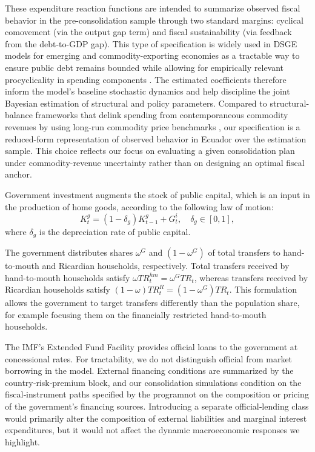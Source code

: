 \documentclass[12pt]{article}
\begin{document}
These expenditure reaction functions are intended to summarize observed fiscal behavior in the pre-consolidation sample through two standard margins: cyclical comovement (via the output gap term) and fiscal sustainability (via feedback from the debt-to-GDP gap). This type of specification is widely used in DSGE models for emerging and commodity-exporting economies as a tractable way to ensure public debt remains bounded while allowing for empirically relevant procyclicality in spending components \citep[see, e.g.,][]{MedinaSoto2016,MelinaYangZanna2016,Buffie2012}. The estimated coefficients therefore inform the model’s baseline stochastic dynamics and help discipline the joint Bayesian estimation of structural and policy parameters. Compared to structural-balance frameworks that delink spending from contemporaneous commodity revenues by using long-run commodity price benchmarks \citep[e.g., Chile’s rule discussed in][]{Frankel2011}, our specification is a reduced-form representation of observed behavior in Ecuador over the estimation sample. This choice reflects our focus on evaluating a given consolidation plan under commodity-revenue uncertainty rather than on designing an optimal fiscal anchor.

Government investment augments the stock of public capital, which is an input in the production of home goods, according to the following law of motion:
\begin{equation*}
K^g_{t} = (1-\delta_g)K^g_{t-1} + G^i_{t}, \quad \delta_g \in [0,1],
\end{equation*}
where $\delta_g$ is the depreciation rate of public capital.

The government distributes shares $\omega^G$ and $(1-\omega^G)$ of total transfers to hand-to-mouth and Ricardian households, respectively. Total transfers received by hand-to-mouth households satisfy $\omega TR_t^{hm}=\omega^G TR_t$, whereas transfers received by Ricardian households satisfy $(1-\omega)TR_t^{R}=(1-\omega^G) TR_t$. This formulation allows the government to target transfers differently than the population share, for example focusing them on the financially restricted hand-to-mouth households.

The IMF’s Extended Fund Facility provides official loans to the government at concessional rates. For tractability, we do not distinguish official from market borrowing in the model. External financing conditions are summarized by the country‑risk‑premium block, and our consolidation simulations condition on the fiscal‑instrument paths specified by the program\textemdash not on the composition or pricing of the government’s financing sources. Introducing a separate official‑lending class would primarily alter the composition of external liabilities and marginal interest expenditures, but it would not affect the dynamic macroeconomic responses we highlight.
\end{document}
